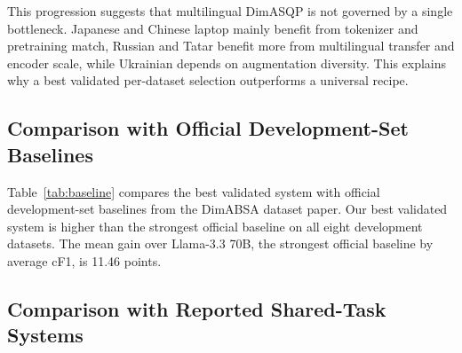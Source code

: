 \documentclass[runningheads]{llncs}
\begin{document}
This progression suggests that multilingual DimASQP is not governed by
a single bottleneck. Japanese and Chinese laptop mainly benefit from
tokenizer and pretraining match, Russian and Tatar benefit more from
multilingual transfer and encoder scale, while Ukrainian depends on
augmentation diversity. This explains why a best validated
per-dataset selection outperforms a universal recipe.

\subsection{Comparison with Official Development-Set Baselines}

Table~\ref{tab:baseline} compares the best validated system with
official development-set baselines from the DimABSA dataset paper. Our
best validated system is higher than the strongest official baseline on
all eight development datasets. The mean gain over Llama-3.3 70B, the
strongest official baseline by average cF1, is 11.46 points.

\begin{table}[t]
\centering
\caption{Comparison with official development-set baselines from arXiv:2601.23022.}
\label{tab:baseline}
\end{table}

\subsection{Comparison with Reported Shared-Task Systems}
\end{document}
